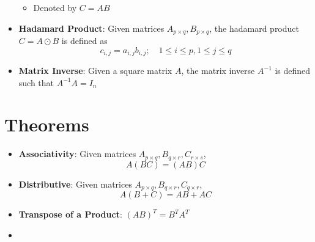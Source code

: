 \documentclass{report}
\begin{document}
\begin{itemize}
        \begin{itemize}
          \item Denoted by $C = AB$
        \end{itemize}
  \item \textbf{Hadamard Product}: Given matrices $A_{p\times q}, B_{p\times q}$, the hadamard product $C = A\odot B$ is defined as $$c_{i,j} = a_{i,j}b_{i,j}; \quad 1 \leq i \leq p, 1 \leq j \leq q$$
  \item \textbf{Matrix Inverse}: Given a square matrix $A$, the matrix inverse $A^{-1}$ is defined such that $A^{-1}A = I_n$
\end{itemize}

\section{Theorems}
\begin{itemize}
  \item \textbf{Associativity}: Given matrices $A_{p \times q}, B_{q \times r}, C_{r \times s}$, $$A(BC) = (AB)C$$
  \item \textbf{Distributive}: Given matrices $A_{p \times q}, B_{q \times r}, C_{q \times r}$, $$A(B+C) = AB+AC$$
  \item \textbf{Transpose of a Product}: $(AB)^T = B^TA^T$
  \item
\end{itemize}


\end{document}
